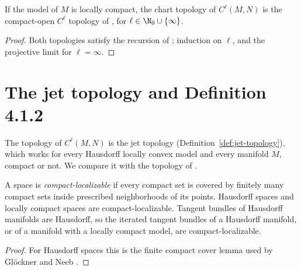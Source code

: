 \begin{theorem}
  \label{thm:mapping-topology-gn}
  \leanok
  If the model of $M$ is locally compact, the chart topology of $C^\ell(M, N)$ is the compact-open
  $C^\ell$ topology of \cite[Def.~4.1.2]{GN26}, for $\ell \in \N_0 \cup \{\infty\}$.
\end{theorem}

\begin{proof}
  \leanok
  Both topologies satisfy the recursion of \cite[Lemma~4.1.6]{GN26}; induction on $\ell$, and the
  projective limit for $\ell = \infty$.
\end{proof}


\section{The jet topology and Definition 4.1.2}

The topology of $C^\ell(M, N)$ is the jet topology (Definition~\ref{def:jet-topology}), which
works for every Hausdorff locally convex model and every manifold $M$, compact or not. We compare
it with the topology of \cite[Def.~4.1.2]{GN26}.

\begin{lemma}
  \label{lem:compact-localizable}
  \leanok
  A space is \emph{compact-localizable} if every compact set is covered by finitely many compact
  sets inside prescribed neighborhoods of its points. Hausdorff spaces and locally compact spaces
  are compact-localizable. Tangent bundles of Hausdorff manifolds are Hausdorff, so the iterated
  tangent bundles of a Hausdorff manifold, or of a manifold with a locally compact model, are
  compact-localizable.
\end{lemma}

\begin{proof}
  \leanok
  For Hausdorff spaces this is the finite compact cover lemma used by Glöckner and Neeb
  \cite[Lemma~A.6.11]{GN26}.
\end{proof}

